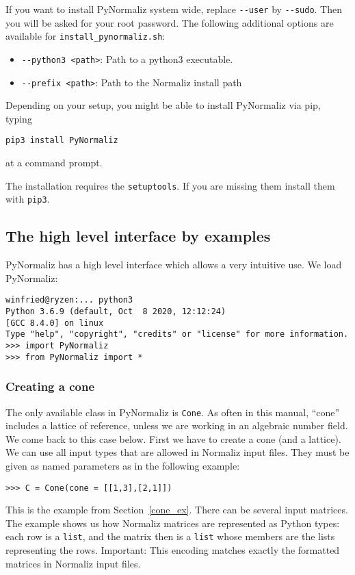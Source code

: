 \begin{small}
If you want to install PyNormaliz system wide,
replace \verb|--user| by \verb|--sudo|. Then you will be asked for your root password.
The following additional options are available for \verb|install_pynormaliz.sh|:
\begin{itemize}
	\item \verb|--python3 <path>|: Path to a python3 executable.
	\item \verb|--prefix <path>|: Path to the Normaliz install path
\end{itemize}

Depending on your setup, you might be able to install PyNormaliz via pip, typing
\begin{Verbatim}
pip3 install PyNormaliz
\end{Verbatim}
at a command prompt.

The installation requires the \verb|setuptools|. If you are missing them install them with  \verb|pip3|.


\subsection{The high level interface by examples}

PyNormaliz has a high level interface which allows a very intuitive use. We load PyNormaliz:
\begin{Verbatim}
winfried@ryzen:... python3
Python 3.6.9 (default, Oct  8 2020, 12:12:24) 
[GCC 8.4.0] on linux
Type "help", "copyright", "credits" or "license" for more information.
>>> import PyNormaliz
>>> from PyNormaliz import *
\end{Verbatim}

\subsubsection{Creating a cone}

The only available class in PyNormaliz is \verb|Cone|. As often in this manual, ``cone'' includes a lattice of reference, unless we are working in an algebraic number field. We come back to this case below. First we have to create a cone (and a lattice). We can use all input types that are allowed in Normaliz input files. They must be given as named parameters as in the following example:
\begin{Verbatim}
>>> C = Cone(cone = [[1,3],[2,1]])
\end{Verbatim}
This is the example from Section~\ref{cone_ex}. There can be several input matrices. The example shows us how Normaliz matrices are represented as Python types: each row is a \verb|list|, and the matrix then is a \verb|list| whose members are the lists representing the rows. Important: This encoding matches exactly the formatted matrices in Normaliz input files.


\end{small}
